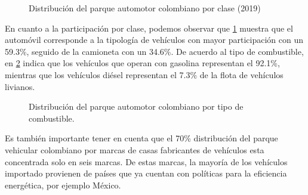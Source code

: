  \begin{figure}[htbp]
   \centering
   
    \caption{Distribución del parque automotor colombiano por clase (2019) \cite{ICCT_Performance_2020}}
    \label{fig:linebaseclase}
\end{figure}

En cuanto a la participación por clase, podemos observar que \ref{fig:linebaseclase} muestra que el automóvil corresponde a la tipología de vehículos con mayor participación con un 59.3\%, seguido de la camioneta con un 34.6\%. De acuerdo al tipo de combustible, en \ref{fig:linebasecomb} indica que los vehículos que operan con gasolina representan el 92.1\%, mientras que los vehículos diésel representan el 7.3\% de la flota de vehículos livianos.

 \begin{figure}[htbp]
   \centering
   
    \caption{Distribución del parque automotor colombiano por tipo de combustible. \cite{ICCT_Performance_2020}}
    \label{fig:linebasecomb}
\end{figure}

Es también importante tener en cuenta que el 70\% distribución del parque vehicular colombiano por marcas de casas fabricantes de vehículos esta concentrada solo en seis marcas. De estas marcas, la mayoría de los vehículos importado provienen de países que ya cuentan con políticas para la eficiencia energética, por ejemplo México. 